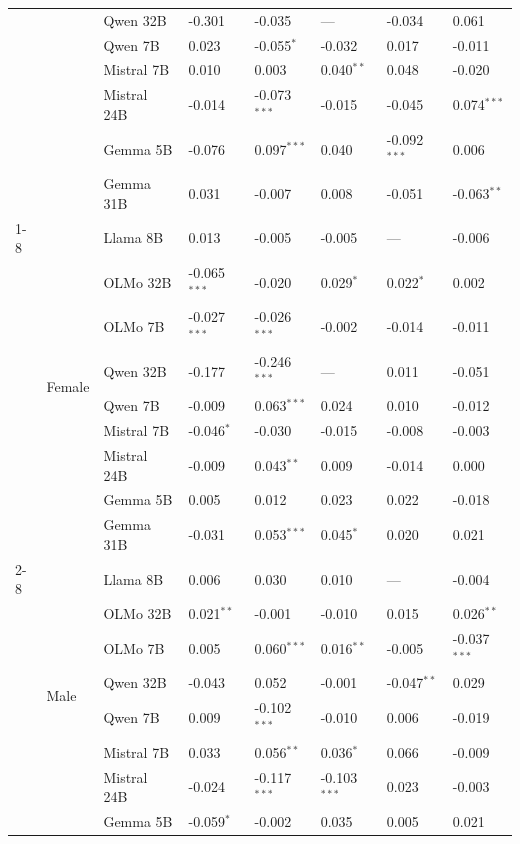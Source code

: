 \begin{longtable}[t]{llllllll}
 &  & Qwen 32B & -0.301 & -0.035 & --- & -0.034 & 0.061 \\
 &  & Qwen 7B & 0.023 & -0.055$^{*}$ & -0.032 & 0.017 & -0.011 \\
 &  & Mistral 7B & 0.010 & 0.003 & 0.040$^{**}$ & 0.048 & -0.020 \\
 &  & Mistral 24B & -0.014 & -0.073$^{***}$ & -0.015 & -0.045 & 0.074$^{***}$ \\
 &  & Gemma 5B & -0.076 & 0.097$^{***}$ & 0.040 & -0.092$^{***}$ & 0.006 \\
 &  & Gemma 31B & 0.031 & -0.007 & 0.008 & -0.051 & -0.063$^{**}$ \\
\cline{1-8} \cline{2-8}
\multirow[t]{36}{*}{Gender} & \multirow[t]{9}{*}{Female} & Llama 8B & 0.013 & -0.005 & -0.005 & --- & -0.006 \\
 &  & OLMo 32B & -0.065$^{***}$ & -0.020 & 0.029$^{*}$ & 0.022$^{*}$ & 0.002 \\
 &  & OLMo 7B & -0.027$^{***}$ & -0.026$^{***}$ & -0.002 & -0.014 & -0.011 \\
 &  & Qwen 32B & -0.177 & -0.246$^{***}$ & --- & 0.011 & -0.051 \\
 &  & Qwen 7B & -0.009 & 0.063$^{***}$ & 0.024 & 0.010 & -0.012 \\
 &  & Mistral 7B & -0.046$^{*}$ & -0.030 & -0.015 & -0.008 & -0.003 \\
 &  & Mistral 24B & -0.009 & 0.043$^{**}$ & 0.009 & -0.014 & 0.000 \\
 &  & Gemma 5B & 0.005 & 0.012 & 0.023 & 0.022 & -0.018 \\
 &  & Gemma 31B & -0.031 & 0.053$^{***}$ & 0.045$^{*}$ & 0.020 & 0.021 \\
\cline{2-8}
 & \multirow[t]{9}{*}{Male} & Llama 8B & 0.006 & 0.030 & 0.010 & --- & -0.004 \\
 &  & OLMo 32B & 0.021$^{**}$ & -0.001 & -0.010 & 0.015 & 0.026$^{**}$ \\
 &  & OLMo 7B & 0.005 & 0.060$^{***}$ & 0.016$^{**}$ & -0.005 & -0.037$^{***}$ \\
 &  & Qwen 32B & -0.043 & 0.052 & -0.001 & -0.047$^{**}$ & 0.029 \\
 &  & Qwen 7B & 0.009 & -0.102$^{***}$ & -0.010 & 0.006 & -0.019 \\
 &  & Mistral 7B & 0.033 & 0.056$^{**}$ & 0.036$^{*}$ & 0.066 & -0.009 \\
 &  & Mistral 24B & -0.024 & -0.117$^{***}$ & -0.103$^{***}$ & 0.023 & -0.003 \\
 &  & Gemma 5B & -0.059$^{*}$ & -0.002 & 0.035 & 0.005 & 0.021 \\

\end{longtable}
